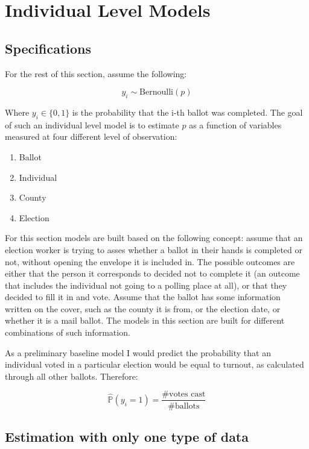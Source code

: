 \documentclass[12pt,twoside]{reedthesis}
\begin{document}
  \section{Individual Level Models}\label{individual-level-models}
  
  \subsection{Specifications}\label{specifications-1}
  
  For the rest of this section, assume the following:
  
  \[y_i \sim \text{Bernoulli}(p)\]
  
  Where \(y_i \in \{0,1\}\) is the probability that the i-th ballot was
  completed. The goal of such an individual level model is to estimate
  \(p\) as a function of variables measured at four different level of
  observation:
  
  \begin{enumerate}
     \item Ballot
     \item Individual
     \item County
     \item Election
  \end{enumerate}
  
  For this section models are built based on the following concept: assume
  that an election worker is trying to asses whether a ballot in their
  hands is completed or not, without opening the envelope it is included
  in. The possible outcomes are either that the person it corresponds to
  decided not to complete it (an outcome that includes the individual not
  going to a polling place at all), or that they decided to fill it in and
  vote. Assume that the ballot has some information written on the cover,
  such as the county it is from, or the election date, or whether it is a
  mail ballot. The models in this section are built for different
  combinations of such information.
  
  As a preliminary baseline model I would predict the probability that an
  individual voted in a particular election would be equal to turnout, as
  calculated through all other ballots. Therefore:
  
  \[\hat{\mathbb{P}}(y_i = 1) = \frac{\# \text{votes cast}}{\# \text{ballots}}\]
  
  \subsection{Estimation with only one type of
  data}\label{estimation-with-only-one-type-of-data}
  
\end{document}
